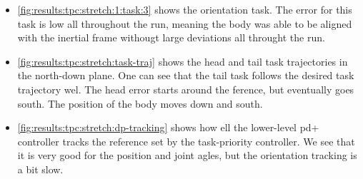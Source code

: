 \begin{itemize}
    \item \autoref{fig:results:tpc:stretch:1:task:3} shows the orientation task. The error for this task is low all throughout the run, meaning the body
        was able to be aligned with the inertial frame withougt large deviations all throught the run.
    \item \autoref{fig:results:tpc:stretch:task-traj} shows the head and tail task trajectories in the north-down plane.    One can see that the tail task follows the desired task trajectory wel. The head error starts around the ference, but eventually goes south. The position of the body moves down and south.
    \item \autoref{fig:results:tpc:stretch:dp-tracking} shows how ell the lower-level \gls{pd+} controller tracks the reference set by the task-priority controller. We see that it is very good for the position and joint agles, but the orientation tracking is a bit slow. 
\end{itemize}

